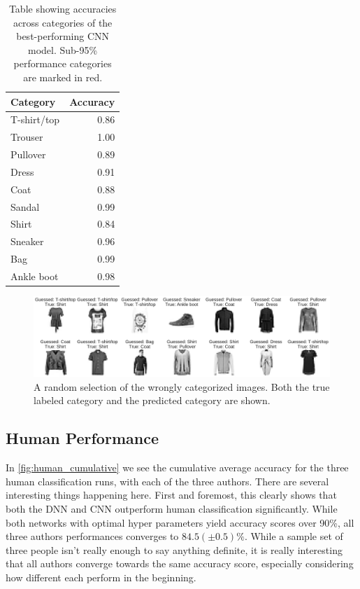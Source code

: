 \documentclass[10pt, twocolumn]{article}
\begin{document}
\begin{table}[H]
    \centering
    \begin{tabular}{l r}
        \textbf{Category} &  \textbf{Accuracy} \\
        \hline
     T-shirt/top &      \color{red} 0.86 \\
        \hline
         Trouser &      1.00 \\
        \hline
        Pullover &      \color{red} 0.89 \\
        \hline
           Dress &      \color{red} 0.91 \\
        \hline
            Coat &      \color{red} 0.88 \\
        \hline
          Sandal &      0.99 \\
        \hline
           Shirt &      \color{red} 0.84 \\
        \hline
         Sneaker &      0.96 \\
        \hline
             Bag &      0.99 \\
        \hline
      Ankle boot &      0.98 \\
      \hline
    \end{tabular}
    \caption{Table showing accuracies across categories of the best-performing CNN model. Sub-95\% performance categories are marked in red.}
    \label{tab:performance_table}
\end{table}


\begin{figure}[ht!]
    \centering
    \includegraphics[scale=0.4]{figs/wrong_images.pdf}
    \caption{A random selection of the wrongly categorized images. Both the true labeled category and the predicted category are shown.}
    \label{fig:wrong_iamges}
\end{figure}



\subsection{Human Performance}
In \cref{fig:human_cumulative} we see the cumulative average accuracy for the three human classification runs, with each of the three authors. There are several interesting things happening here. First and foremost, this clearly shows that both the DNN and CNN outperform human classification significantly. While both networks with optimal hyper parameters yield accuracy scores over 90\%, all three authors performances converges to $84.5(\pm 0.5)\%$. While a sample set of three people isn't really enough to say anything definite, it is really interesting that all authors converge towards the same accuracy score, especially considering how different each perform in the beginning.
\end{document}
